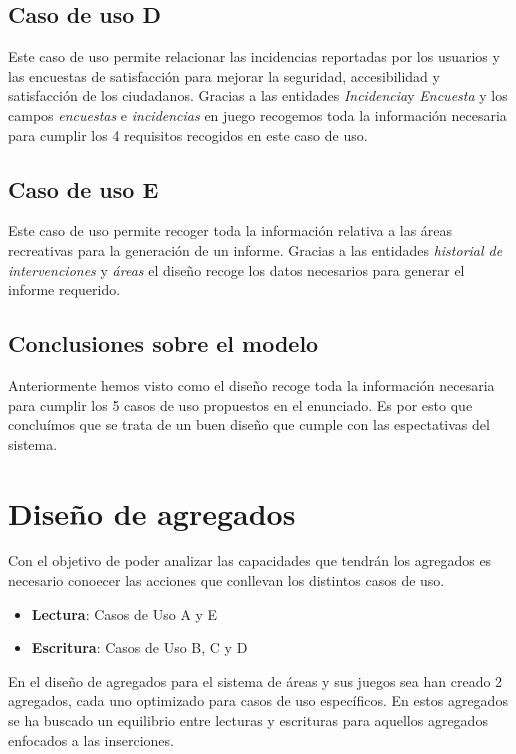 \documentclass[]{article}
\begin{document}
\subsection{Caso de uso D}
\label{subsec:casoD}
Este caso de uso permite relacionar las incidencias reportadas por los usuarios y las encuestas de satisfacción para mejorar la seguridad, accesibilidad y satisfacción de los ciudadanos. Gracias a las entidades \textit{Incidencia}y \textit{Encuesta} y los campos \textit{encuestas} e \textit{incidencias} en juego recogemos toda la información necesaria para cumplir los 4 requisitos recogidos en este caso de uso.

\subsection{Caso de uso E}
\label{subsec:casoE}
Este caso de uso permite recoger toda la información relativa a las áreas recreativas para la generación de un informe. Gracias a las entidades \textit{historial de intervenciones} y \textit{áreas} el diseño recoge los datos necesarios para generar el informe requerido.

\subsection{Conclusiones sobre el modelo}
\label{subsec:conclusiones-modelo}
Anteriormente hemos visto como el diseño recoge toda la información necesaria para cumplir los 5 casos de uso propuestos en el enunciado. Es por esto que concluímos que se trata de un buen diseño que cumple con las espectativas del sistema.

\section{Diseño de agregados}
\label{sec:agregados}
Con el objetivo de poder analizar las capacidades que tendrán los agregados es necesario conoecer las acciones que conllevan los distintos casos de uso.
\begin{itemize}
    \item \textbf{Lectura}: Casos de Uso A y E
    \item \textbf{Escritura}: Casos de Uso B, C y D
\end{itemize}

En el diseño de agregados para el sistema de áreas y sus juegos sea han creado 2 agregados, cada uno optimizado para casos de uso específicos. En estos agregados se ha buscado un equilibrio entre lecturas y escrituras para aquellos agregados enfocados a las inserciones.
\end{document}

